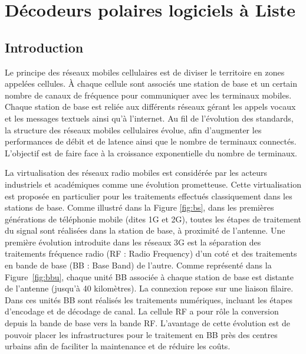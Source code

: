 \chapter{Décodeurs polaires logiciels à Liste} %
\label{chap:soft_scl}

\vspace*{\fill}
\minitocTITI
\vspace*{\fill}
\newpage


\section{Introduction}

Le principe des réseaux mobiles cellulaires est de diviser le territoire en zones appelées cellules. \`A chaque cellule sont associés une station de base et un certain nombre de canaux de fréquence pour communiquer avec les terminaux mobiles. Chaque station de base est reliée aux différents réseaux gérant les appels vocaux et les messages textuels ainsi qu'à l'internet. Au fil de l'évolution des standards, la structure des réseaux mobiles cellulaires évolue, afin d'augmenter les performances de débit et de latence ainsi que le nombre de terminaux connectés. L'objectif est de faire face à la croissance exponentielle du nombre de terminaux.

La virtualisation des réseaux radio mobiles est considérée par les acteurs industriels \cite{ericsson_cloud_2015,huawei_5g:_2013} et académiques \cite{wubben_benefits_2014,rost_cloud_2014,checko_cloud_2015} comme une évolution prometteuse. Cette virtualisation est proposée en particulier pour les traitements effectués classiquement dans les stations de base. Comme illustré dans la Figure \ref{fig:bs}, dans les premières générations de téléphonie mobile (dites 1G et 2G), toutes les étapes de traitement du signal sont réalisées dans la station de base, à proximité de l'antenne. Une première évolution introduite dans les réseaux 3G est la séparation des traitements fréquence radio (RF : Radio Frequency) d'un coté et des traitements en bande de base (BB : Base Band) de l'autre. Comme représenté dans la Figure~\ref{fig:bbu}, chaque unité BB associée à chaque station de base est distante de l'antenne (jusqu'à 40 kilomètres). La connexion repose sur une liaison filaire. Dans ces unités BB sont réalisés les traitements numériques, incluant les étapes d'encodage et de décodage de canal. La cellule RF a pour rôle la conversion depuis la bande de base vers la bande RF. L'avantage de cette évolution est de pouvoir placer les infrastructures pour le traitement en BB près des centres urbains afin de faciliter la maintenance et de réduire les coûts.

